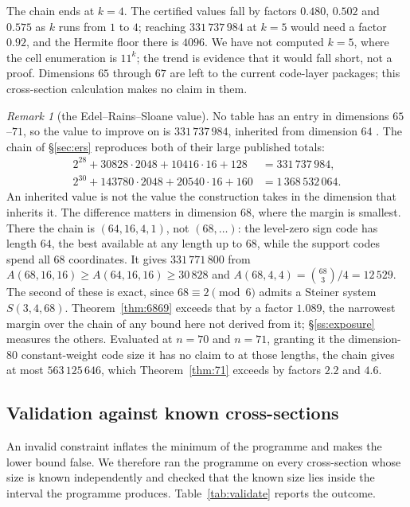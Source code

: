\documentclass[11pt]{amsart}
\theoremstyle{remark}
\newtheorem{remark}[theorem]{Remark}
\begin{document}
The chain ends at $k=4$. The certified values fall by factors $0.480$, $0.502$
and $0.575$ as $k$ runs from $1$ to $4$; reaching $331\,737\,984$ at $k=5$ would
need a factor $0.92$, and the Hermite floor there is $4096$. We have not computed
$k=5$, where the cell enumeration is $11^k$; the trend is evidence that it would
fall short, not a proof. Dimensions $65$ through $67$ are left to the current
code-layer packages; this cross-section calculation makes no claim in them.

\begin{remark}[the Edel--Rains--Sloane value]\label{rem:ers}
No table has an entry in dimensions $65$--$71$, so the value to improve on is
$331\,737\,984$, inherited from dimension $64$ \cite{edel-rains-sloane1998}. The
chain of \S\ref{sec:ers} reproduces both of their large published totals:
\begin{align*}
  2^{28}+30828\cdot2048+10416\cdot16+128 &= 331\,737\,984,\\
  2^{30}+143780\cdot2048+20540\cdot16+160 &= 1\,368\,532\,064.
\end{align*}
An inherited value is not the value the construction takes in the dimension that
inherits it. The difference matters in dimension $68$, where the margin is
smallest. There the chain is $(64,16,4,1)$, not $(68,\dots)$: the level-zero sign code
has length $64$, the best available at any length up to $68$, while the support codes
spend all $68$ coordinates. It gives $331\,771\,800$ from
$A(68,16,16)\ge A(64,16,16)\ge30\,828$ and
$A(68,4,4)=\binom{68}{3}/4=12\,529$. The second of these is exact, since
$68\equiv2\pmod6$ admits a Steiner system $S(3,4,68)$. Theorem~\ref{thm:6869}
exceeds that by a factor $1.089$, the narrowest margin over the chain of any bound
here not derived from it; \S\ref{ss:exposure} measures the others. Evaluated at $n=70$ and $n=71$, granting it the dimension-$80$
constant-weight code size it has no claim to at those lengths, the chain gives
at most $563\,125\,646$, which Theorem~\ref{thm:71} exceeds by factors $2.2$ and
$4.6$.
\end{remark}

\subsection{Validation against known cross-sections}\label{ss:validate}

An invalid constraint inflates the minimum of the programme and makes the lower
bound false. We therefore ran the programme on every cross-section whose size is
known independently and checked that the known size lies inside the interval the
programme produces. Table~\ref{tab:validate} reports the outcome.
\end{document}
